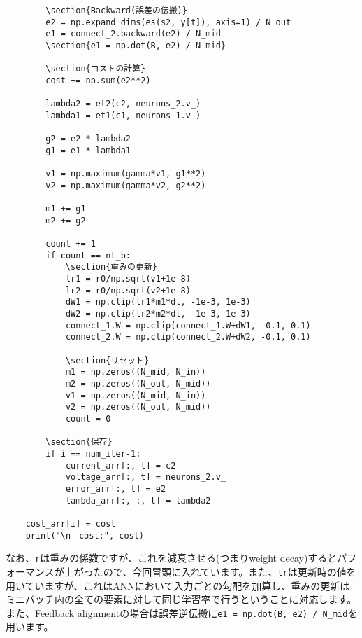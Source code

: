 \begin{verbatim}
        \section{Backward(誤差の伝搬)}
        e2 = np.expand_dims(es(s2, y[t]), axis=1) / N_out
        e1 = connect_2.backward(e2) / N_mid
        \section{e1 = np.dot(B, e2) / N_mid}

        \section{コストの計算}
        cost += np.sum(e2**2)
        
        lambda2 = et2(c2, neurons_2.v_)
        lambda1 = et1(c1, neurons_1.v_)
        
        g2 = e2 * lambda2
        g1 = e1 * lambda1
        
        v1 = np.maximum(gamma*v1, g1**2)
        v2 = np.maximum(gamma*v2, g2**2)
        
        m1 += g1
        m2 += g2
    
        count += 1
        if count == nt_b:
            \section{重みの更新}
            lr1 = r0/np.sqrt(v1+1e-8)
            lr2 = r0/np.sqrt(v2+1e-8)
            dW1 = np.clip(lr1*m1*dt, -1e-3, 1e-3)
            dW2 = np.clip(lr2*m2*dt, -1e-3, 1e-3)
            connect_1.W = np.clip(connect_1.W+dW1, -0.1, 0.1)
            connect_2.W = np.clip(connect_2.W+dW2, -0.1, 0.1)
            
            \section{リセット}
            m1 = np.zeros((N_mid, N_in))
            m2 = np.zeros((N_out, N_mid))
            v1 = np.zeros((N_mid, N_in))
            v2 = np.zeros((N_out, N_mid))
            count = 0
            
        \section{保存}
        if i == num_iter-1:
            current_arr[:, t] = c2
            voltage_arr[:, t] = neurons_2.v_
            error_arr[:, t] = e2
            lambda_arr[:, :, t] = lambda2
    
    cost_arr[i] = cost
    print("\n　cost:", cost)
\end{verbatim}
なお、\texttt{r}は重みの係数ですが、これを減衰させる(つまりweight decay)するとパフォーマンスが上がったので、今回冒頭に入れています。また、\texttt{lr}は更新時の値を用いていますが、これはANNにおいて入力ごとの勾配を加算し、重みの更新はミニバッチ内の全ての要素に対して同じ学習率で行うということに対応します。また、Feedback alignmentの場合は誤差逆伝搬に\colorbox{shadecolor}{\texttt{e1 = np.dot(B, e2) / N\_mid}}を用います。
